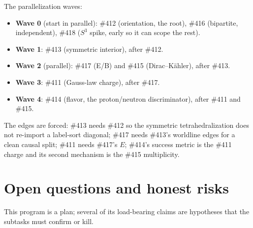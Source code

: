 \documentclass[11pt]{article}
\theoremstyle{definition}
\begin{document}
\noindent The parallelization waves:
\begin{itemize}[nosep]
  \item \textbf{Wave 0} (start in parallel): \#412 (orientation, the root), \#416
  (bipartite, independent), \#418 ($S^3$ spike, early so it can scope the rest).
  \item \textbf{Wave 1}: \#413 (symmetric interior), after \#412.
  \item \textbf{Wave 2} (parallel): \#417 (E/B) and \#415 (Dirac--K\"ahler), after \#413.
  \item \textbf{Wave 3}: \#411 (Gauss-law charge), after \#417.
  \item \textbf{Wave 4}: \#414 (flavor, the proton/neutron discriminator), after \#411
  and \#415.
\end{itemize}
The edges are forced: \#413 needs \#412 so the symmetric tetrahedralization does not
re-import a label-sort diagonal; \#417 needs \#413's worldline edges for a clean causal
split; \#411 needs \#417's $E$; \#414's success metric is the \#411 charge and its second
mechanism is the \#415 multiplicity.

\section{Open questions and honest risks}
\label{sec:risks}

This program is a plan; several of its load-bearing claims are hypotheses that the
subtasks must confirm or kill.
\end{document}
